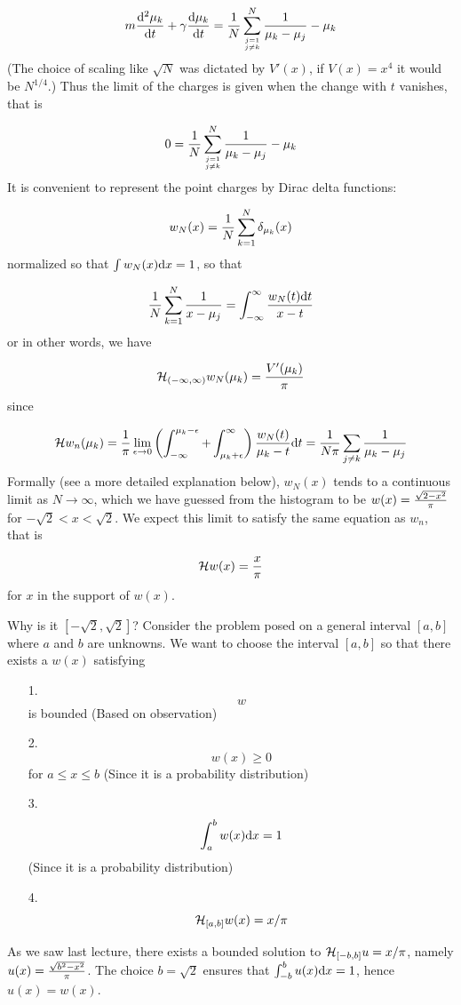 \documentclass[12pt,a4paper]{article}
\def\D{ {\rm d} }
\def\HH{ {\cal H} }
\def\dx{\D x}
\def\dt{\D t}
\begin{document}
\[
 m {\D^2  \mu_k \over \D t} + \gamma {\D  \mu_k \over \D t}= {1 \over N} \sum_{j=1 \atop j \neq k}^N {1 \over \mu_k -\mu_j} -  \mu_k
\]
(The choice of scaling like $\sqrt N$ was dictated by $V'(x)$, if $V(x) = x^4$ it would be $N^{1/4}$.)  Thus the limit of the charges is given when the change with $t$ vanishes, that is 

\[
0 = {1 \over N} \sum_{j=1 \atop j \neq k}^N {1 \over \mu_k -\mu_j} -  \mu_k 
\]
It is convenient to represent the point charges by Dirac delta functions:

\[
    w_N(x) = {1 \over N} \sum_{k=1}^N \delta_{\mu_k}(x)
\]
normalized so that $\int w_N(x) \dx = 1$, so that

\[
    {1 \over N} \sum_{k=1}^N {1 \over  x -\mu_j} = \int_{-\infty}^\infty {w_N(t) \dt \over x - t}
\]
or in other words, we have 

\[
 \HH_{(-\infty,\infty)} w_N(\mu_k) = {V'(\mu_k) \over \pi}
\]
since

\[
\HH w_n (\mu_k) = {1 \over \pi} \lim_{\epsilon\rightarrow 0} \left(\int_{-\infty}^{\mu_k-\epsilon} + \int_{\mu_k+\epsilon}^\infty\right) {w_N(t)  \over  \mu_k-t} \dt  = {1 \over N\pi} \sum_{j \neq k} {1 \over \mu_k - \mu_j}
\]
Formally (see a more detailed explanation below), $w_N(x)$ tends to a continuous limit as $N\rightarrow \infty$,  which we have guessed from the histogram to be $w(x) = { \sqrt{2-x^2}  \over \pi}$ for $-\sqrt 2 < x < \sqrt2$.   We expect this limit to satisfy the same equation as $w_n$, that is

\[
 \HH w(x) = {x \over \pi}
\]
for $x$ in the support of $w(x)$.

Why is it $[-\sqrt 2, \sqrt 2]$? Consider the problem posed on a general interval $[a,b]$ where $a$ and $b$ are unknowns.  We  want to choose the interval $[a,b]$ so that there exists a $w(x)$  satisfying

\begin{itemize}
\item[1. ] \[
w
\]
is bounded (Based on observation)


\item[2. ] \[
w(x) \geq 0
\]
for $a \leq x \leq b$ (Since it is a probability distribution)


\item[3. ] \[
\int_a^b w(x) \dx = 1
\]
(Since it is a probability distribution)


\item[4. ] \[
\HH_{[a,b]} w(x) = x/\pi
\]
\end{itemize}
As we saw last lecture, there exists a bounded solution to  $\HH_{[-b,b]} u =  x/\pi$, namely  $u(x) = { \sqrt{b^2-x^2} \over \pi}$. The choice $b = \sqrt{2}$ ensures that $\int_{-b}^b u(x) \dx = 1$, hence $u(x) = w(x)$.
\end{document}
